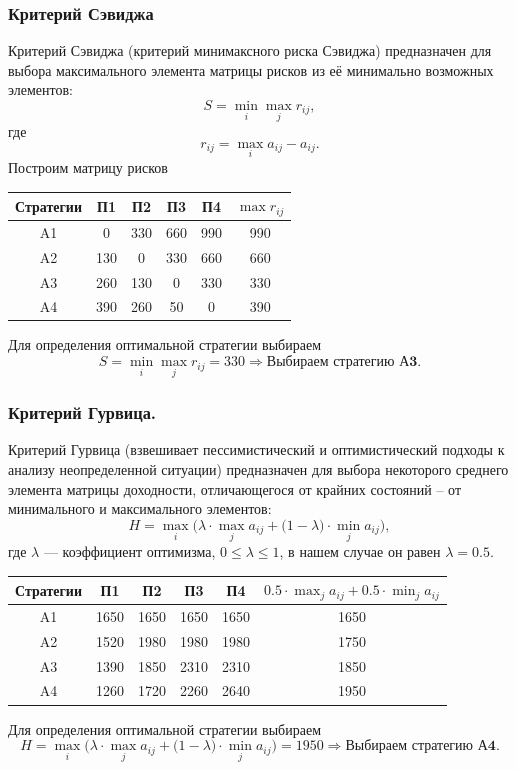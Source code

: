 \documentclass[11pt]{article}
\begin{document}
\subsubsection*{Критерий Сэвиджа}
Критерий Сэвиджа (критерий минимаксного риска
Сэвиджа) предназначен для выбора максимального элемента
матрицы рисков из её минимально возможных элементов:
$$S = \min_i \max_j r_{ij},$$ где $$r_{ij} = \max_ia_{ij} - a_{ij}.$$
Построим матрицу рисков
\begin{table}[h]
    \centering
    \begin{tabular}{|c|c|c|c|c|c|}
        \hline
         Стратегии & П1 & П2 & П3 & П4 & $\max r_{ij}$\\
        \hline
         A1 & 0 & 330 & 660 & 990 & 990\\
         \hline
         A2 & 130 & 0 & 330 & 660 & 660\\
         \hline
         A3 & 260 & 130 & 0 & 330 & 330 \\
         \hline
         A4 & 390 & 260 & 50 & 0 & 390\\
         \hline
    \end{tabular}
\end{table}

Для определения оптимальной стратегии выбираем $$S = \min_i \max_j r_{ij} = 330 \Rightarrow \textbf{Выбираем стратегию А3}.$$

\subsubsection*{Критерий Гурвица.}
Критерий Гурвица (взвешивает пессимистический и
оптимистический подходы к анализу неопределенной
ситуации) предназначен для выбора некоторого среднего
элемента матрицы доходности, отличающегося от крайних
состояний – от минимального и максимального элементов:
$$H = \max_i {(} λ \cdot \max_j a_{ij} + {(}1 - λ{)} \cdot \min_j a_{ij}{)}, $$
где $λ$ — коэффициент оптимизма, $0 \leq λ \leq 1$, в нашем случае он равен $\lambda = 0.5$.
\begin{table}[h]
    \centering
    \begin{tabular}{|c|c|c|c|c|c|}
        \hline
         Стратегии & П1 & П2 & П3 & П4 & $ 0.5 \cdot \max_j a_{ij} + 0.5 \cdot \min_j a_{ij}$\\
         \hline
         A1 & 1650 & 1650 & 1650 & 1650 & 1650 \\
         \hline
         A2 & 1520 & 1980 & 1980 & 1980 & 1750 \\
         \hline
         A3 & 1390 & 1850 & 2310 & 2310 & 1850\\
         \hline 
         A4 & 1260 & 1720 & 2260 & 2640 & 1950\\
         \hline
    \end{tabular}
\end{table}

Для определения оптимальной стратегии выбираем $$H = \max_i {(} λ \cdot \max_j a_{ij} + {(}1 - λ{)} \cdot \min_j a_{ij}{)} = 1950 \Rightarrow \textbf{Выбираем стратегию А4}.$$
\end{document}
